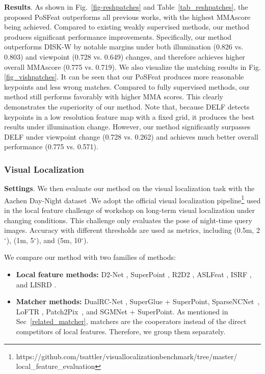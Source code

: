 \documentclass[10pt,twocolumn,letterpaper]{article}
\begin{document}
\noindent\textbf{Results}. 
As shown in Fig.~\ref{fig-reshpatches} and Table~\ref{tab_reshpatches}, the proposed PoSFeat outperforms all previous works, with the highest MMAscore being achieved. Compared to existing weakly supervised methods, our method produces significant performance improvements. Specifically, our method outperforms DISK-W by notable margins under both illumination (0.826 vs. 0.803) and viewpoint (0.728 vs. 0.649) changes, and therefore achieves higher overall MMAscore (0.775 vs. 0.719). We also visualize the matching results in Fig. \ref{fig_vishpatches}. It can be seen that our PoSFeat produces more reasonable keypoints and less wrong matches. Compared to fully supervised methods, our method still performs favorably with higher MMA scores. This clearly demonstrates the superiority of our method. Note that, because DELF detects keypoints in a low resolution feature map with a fixed grid, it produces the best results under illumination change. However, our method significantly surpasses DELF under viewpoint change (0.728 vs. 0.262) and achieves much better overall performance (0.775 vs. 0.571).


\subsubsection{Visual Localization}
\textbf{Settings}. We then evaluate our method on the visual localization task with the Aachen Day-Night dataset \cite{zhang2021reference}.We adopt the official visual localization pipeline\footnote{https://github.com/tsattler/visuallocalizationbenchmark/tree/master/ local\_feature\_evaluation} used in the local feature challenge of workshop on long-term visual localization under changing conditions. This challenge only evaluates the pose of night-time query images. Accuracy with different thresholds are used as metrics, including (0.5m, 2$^\circ$), (1m, 5$^\circ$), and (5m, 10$^\circ$).

We compare our method with two families of methods:

\begin{itemize}
    \item \textbf{Local feature methods:} D2-Net \cite{Dusmanu2019CVPR}, SuperPoint \cite{detone2018superpoint}, R2D2 \cite{revaud2019r2d2}, ASLFeat \cite{luo2020aslfeat}, ISRF \cite{melekhov2020image}, and LISRD \cite{pautrat2020online}. 
    \vspace{-0.25cm}
    
    \item \textbf{Matcher methods:}  DualRC-Net \cite{li2020dual}, SuperGlue \cite{sarlin2020superglue} + SuperPoint, SparseNCNet~\cite{rocco2020efficient}, LoFTR \cite{sunLoFTRDetectorFreeLocal2021}, Patch2Pix~\cite{zhou2021patch2pix}, and SGMNet \cite{chen2021learning} + SuperPoint. As mentioned in Sec~\ref{related_matcher}, matchers are the cooperators instead of the direct competitors of local features. Therefore, we group them separately.
\end{itemize}
\end{document}
